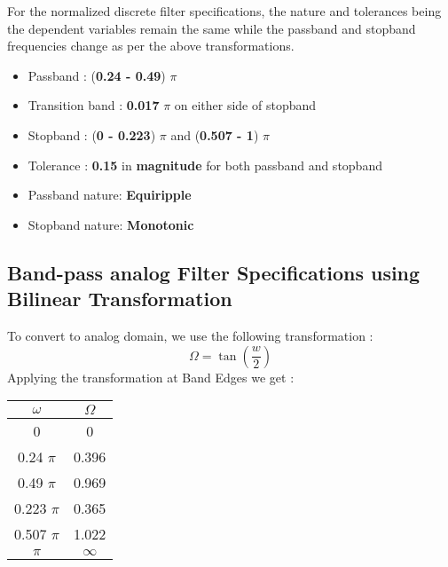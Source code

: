 \documentclass{article}
\begin{document}
\vspace{1em}
\noindent
For the normalized discrete filter specifications, the nature and tolerances being the dependent variables remain the same while the passband and stopband frequencies change as per the above transformations. 
\begin{itemize}
    \item Passband : (\textbf{0.24 -  0.49}) {$\pi$}
    \item  Transition band : \textbf{0.017} $\pi$ on either side of stopband
    \item Stopband : (\textbf{0 - 0.223}) {$\pi$} and (\textbf{0.507 - 1}) {$\pi$}
    \item  Tolerance : \textbf{0.15} in \textbf{magnitude} for both passband and stopband
    \item Passband nature: \textbf{Equiripple}
    \item Stopband nature: \textbf{Monotonic}
\end{itemize}


\subsection{Band-pass analog Filter Specifications using Bilinear
Transformation}
To convert to analog domain, we use the following transformation :
\begin{equation*}
    \Omega = \tan (\frac{w}{2})
\end{equation*}
Applying the transformation at Band Edges we get :
\begin{table}[H]
		\begin{center}
		\begin{tabular}{|c|c|}
			\hline
			$\omega$ & $\Omega$\\
			
			\hline
                0 & 0\\
                \hline
                0.24 $\pi$ & 0.396 \\
                \hline
                0.49 $\pi$ & 0.969\\
                \hline
                0.223 $\pi$ & 0.365\\
                \hline
                0.507 $\pi$ & 1.022\\
                \hline
                $\pi$ & $\infty$\\
                \hline
            
		\end{tabular}
		\end{center}
\end{table}
\end{document}
